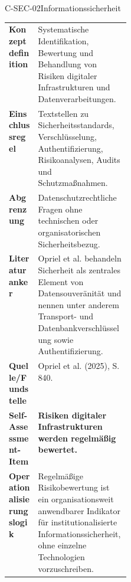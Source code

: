 \documentclass[10pt,a4paper]{article}
\begin{document}
\begin{codecard}{C-SEC-02}{Informationssicherheit}
\begin{tabularx}{\linewidth}{@{}>{\RaggedRight\arraybackslash\bfseries\color{DeepNavy}}p{0.245\linewidth}>{\RaggedRight\arraybackslash}X@{}}
Konzeptdefinition & Systematische Identifikation, Bewertung und Behandlung von Risiken digitaler Infrastrukturen und Datenverarbeitungen. \\
\arrayrulecolor{SoftRule}\hline
Einschlussregel & Textstellen zu Sicherheitsstandards, Verschlüsselung, Authentifizierung, Risikoanalysen, Audits und Schutzmaßnahmen. \\
\arrayrulecolor{SoftRule}\hline
Abgrenzung & Datenschutzrechtliche Fragen ohne technischen oder organisatorischen Sicherheitsbezug. \\
\arrayrulecolor{SoftRule}\hline
Literaturanker & Opriel et al. behandeln Sicherheit als zentrales Element von Datensouveränität und nennen unter anderem Transport- und Datenbankverschlüsselung sowie Authentifizierung. \\
\arrayrulecolor{SoftRule}\hline
Quelle/Fundstelle & Opriel et al. (2025), S. 840. \\
\arrayrulecolor{SoftRule}\hline
Self-Assessment-Item & \textbf{Risiken digitaler Infrastrukturen werden regelmäßig bewertet.} \\
\arrayrulecolor{SoftRule}\hline
Operationalisierungslogik & Regelmäßige Risikobewertung ist ein organisationsweit anwendbarer Indikator für institutionalisierte Informationssicherheit, ohne einzelne Technologien vorzuschreiben. \\
\end{tabularx}
\end{codecard}
\end{document}
